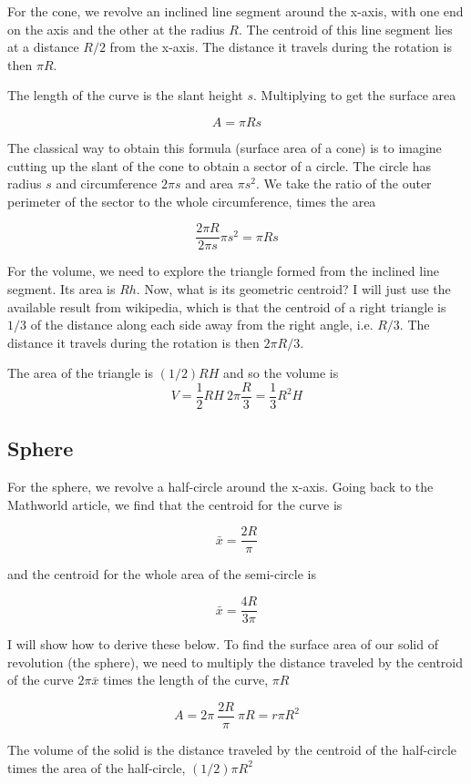 \documentclass[11pt, oneside]{report}   	%
\begin{document}
For the cone, we revolve an inclined line segment around the x-axis, with one end on the axis and the other at the radius $R$.  The centroid of this line segment lies at a distance $R/2$ from the x-axis.  The distance it travels during the rotation is then $\pi R$.

The length of the curve is the slant height $s$.  Multiplying to get the surface area

\[ A = \pi R s \]

The classical way to obtain this formula (surface area of a cone) is to imagine cutting up the slant of the cone to obtain a sector of a circle.  The circle has radius $s$ and circumference $2 \pi s$ and area $\pi s^2$.  We take the ratio of the outer perimeter of the sector to the whole circumference, times the area

\[ \frac{2 \pi R}{2 \pi s} \pi s^2 = \pi R s \]

For the volume, we need to explore the triangle formed from the inclined line segment.  Its area is $Rh$.  Now, what is its geometric centroid?  I will just use the available result from wikipedia, which is that the centroid of a right triangle is $1/3$ of the distance along each side away from the right angle, i.e. $R/3$.  The distance it travels during the rotation is then $2 \pi R/3$.

The area of the triangle is $(1/2) R H$ and so the volume is
\[ V = \frac{1}{2}R H \ 2 \pi \frac{R}{3} = \frac{1}{3}R^2 H \]

\subsection*{Sphere}

For the sphere, we revolve a half-circle around the x-axis.  Going back to the Mathworld article, we find that the centroid for the curve is

\[ \bar{x} = \frac{2 R}{\pi} \] 

and the centroid for the whole area of the semi-circle is

\[ \bar{x} = \frac{4 R}{3 \pi} \]

I will show how to derive these below.  To find the surface area of our solid of revolution (the sphere), we need to multiply the distance traveled by the centroid of the curve $2 \pi \bar{x}$ times the length of the curve, $\pi R$

\[ A = 2 \pi \ \frac{2 R}{\pi} \ \pi R = r \pi R^2 \]

The volume of the solid is the distance traveled by the centroid of the half-circle times the area of the half-circle, $(1/2) \pi R^2$
\end{document}
